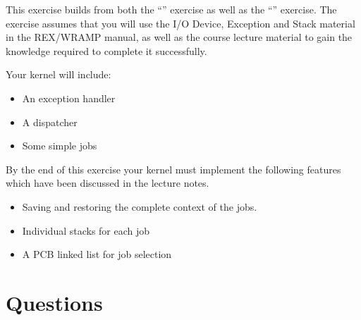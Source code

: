 \documentclass[a4paper,10pt]{article}
\begin{document}
This exercise builds from both the ``\INTERTITLE'' exercise as well as
the ``\MTKSTITLE'' exercise. The exercise assumes that you will use
the I/O Device, Exception and Stack material in the REX/WRAMP manual,
as well as the course lecture material to gain the knowledge required
to complete it successfully.

Your kernel will include:
\begin{itemize}
\setlength{\itemsep}{0cm}
\setlength{\parskip}{0cm}
\item An exception handler
\item A dispatcher
\item Some simple jobs
\end{itemize}

By the end of this exercise your kernel must implement the following
features which have been discussed in the lecture notes.
\begin{itemize}
\setlength{\itemsep}{0cm}
\setlength{\parskip}{0cm}
\item Saving and restoring the complete context of the jobs.
\item Individual stacks for each job
\item A PCB linked list for job selection
\end{itemize}

\section{Questions}
\end{document}
